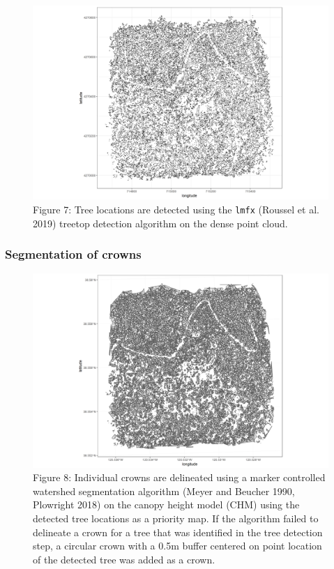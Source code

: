 \documentclass[]{article}
\begin{document}
\begin{figure}
\centering
\includegraphics{../../figures/eldo_3k_3_ttops.png}
\caption{Figure 7: Tree locations are detected using the \texttt{lmfx}
(Roussel et al. 2019) treetop detection algorithm on the dense point
cloud.}
\end{figure}

\subsubsection{Segmentation of crowns}\label{segmentation-of-crowns}

\begin{figure}
\centering
\includegraphics{../../figures/eldo_3k_3_crowns.png}
\caption{Figure 8: Individual crowns are delineated using a marker
controlled watershed segmentation algorithm (Meyer and Beucher 1990,
Plowright 2018) on the canopy height model (CHM) using the detected tree
locations as a priority map. If the algorithm failed to delineate a
crown for a tree that was identified in the tree detection step, a
circular crown with a 0.5m buffer centered on point location of the
detected tree was added as a crown.}
\end{figure}
\end{document}
